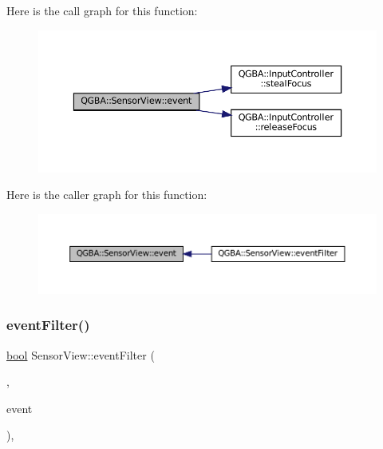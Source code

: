 Here is the call graph for this function\+:
\nopagebreak
\begin{figure}[H]
\begin{center}
\leavevmode
\includegraphics[width=350pt]{class_q_g_b_a_1_1_sensor_view_a058b4e2baa8ca5f86d6335bc698da284_cgraph}
\end{center}
\end{figure}
Here is the caller graph for this function\+:
\nopagebreak
\begin{figure}[H]
\begin{center}
\leavevmode
\includegraphics[width=350pt]{class_q_g_b_a_1_1_sensor_view_a058b4e2baa8ca5f86d6335bc698da284_icgraph}
\end{center}
\end{figure}
\mbox{\label{class_q_g_b_a_1_1_sensor_view_ac36eccf225760726c912ab688ef41270}} 
\subsubsection{\texorpdfstring{event\+Filter()}{eventFilter()}}
{\footnotesize\ttfamily \mbox{\hyperlink{libretro_8h_a4a26dcae73fb7e1528214a068aca317e}{bool}} Sensor\+View\+::event\+Filter (\begin{DoxyParamCaption}\item[{Q\+Object $\ast$}]{,  }\item[{Q\+Event $\ast$}]{event }\end{DoxyParamCaption})\hspace{0.3cm}{\ttfamily [override]}, {\ttfamily [protected]}}

